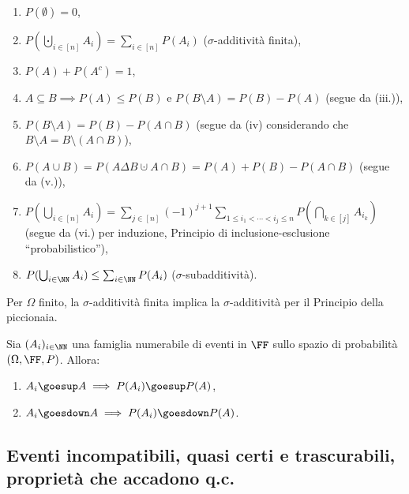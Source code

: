 \begin{multicols*}{2}
\begin{proposition}[Proprietà di $P$]
        \begin{enumerate}[(i.)]
            \item $P(\emptyset) = 0$,
            \item $P(\bigcupdot_{i \in [n]} A_i) = \sum_{i \in [n]} P(A_i)$ ($\sigma$-additività finita),
            \item $P(A) + P(A^c) = 1$,
            \item $A \subseteq B \implies P(A) \leq P(B)$ e $P(B \setminus A) = P(B) - P(A)$ (segue da (iii.)),
            \item $P(B \setminus A) = P(B) - P(A \cap B)$ (segue da (iv) considerando che $B \setminus A = B \setminus (A \cap B)$),
            \item $P(A \cup B) = P(A \Delta B \cupdot A \cap B) = P(A) + P(B) - P(A \cap B)$ (segue da (v.)),
            \item $P(\bigcup_{i \in [n]} A_i) = \sum_{j \in [n]} (-1)^{j+1} \sum_{1 \leq i_1 < \cdots < i_j \leq n} P(\bigcap_{k \in [j]} A_{i_{k}})$ (segue da (vi.) per induzione, Principio di inclusione-esclusione ``probabilistico''),
            \item $P(\bigcup_{i \in \NN} A_i) \leq \sum_{i \in \NN} P(A_i)$ ($\sigma$-subadditività).
        \end{enumerate}
    \end{proposition}

    \begin{remark}
        Per $\Omega$ finito, la $\sigma$-additività finita implica la $\sigma$-additività per il Principio della piccionaia.
    \end{remark}

    \begin{proposition}
        Sia $(A_i)_{i \in \NN}$ una famiglia numerabile di
        eventi in $\FF$ sullo spazio di probabilità
        $(\Omega, \FF, P)$. Allora:

        \begin{enumerate}[(i.)]
            \item $A_i \goesup A \implies P(A_i) \goesup P(A)$,
            \item $A_i \goesdown A \implies P(A_i) \goesdown P(A)$.
        \end{enumerate}
    \end{proposition}

    \subsection{Eventi incompatibili, quasi certi e trascurabili, proprietà che accadono q.c.}


\end{multicols*}
